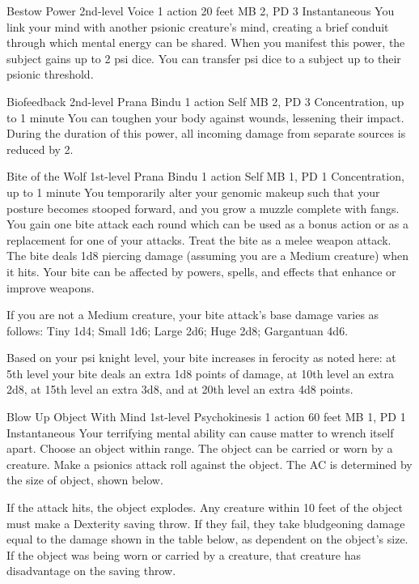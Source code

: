 \DndPowerHeader%
  {Bestow Power}
  {2nd-level Voice}
  {1 action}
  {20 feet}
  {MB 2, PD 3}
  {Instantaneous}
You link your mind with another psionic creature's mind,
creating a brief conduit through which mental energy can be shared.
When you manifest this power,
the subject gains up to 2 psi dice.
You can transfer psi dice to a subject up to their psionic threshold.

\DndPowerHeader%
  {Biofeedback}
  {2nd-level Prana Bindu}
  {1 action}
  {Self}
  {MB 2, PD 3}
  {Concentration, up to 1 minute}
    You can toughen your body against wounds,
    lessening their impact.
    During the duration of this power, all incoming damage
    from separate sources is reduced by 2.

\DndPowerHeader%
  {Bite of the Wolf}
  {1st-level Prana Bindu}
  {1 action}
  {Self}
  {MB 1, PD 1}
  {Concentration, up to 1 minute}
  You temporarily alter your genomic makeup
  such that your posture becomes stooped forward,
  and you grow a muzzle complete with fangs.
  You gain one bite attack each round which
  can be used as a bonus action or as a replacement
  for one of your attacks.
  Treat the bite as a melee weapon attack.
  The bite deals 1d8 piercing damage
  (assuming you are a Medium creature)
  when it hits.
  Your bite can be affected by
  powers, spells, and effects
  that enhance or improve weapons.
  
  If you are not a Medium creature,
  your bite attack's base damage varies as follows:
  Tiny 1d4; Small 1d6; Large 2d6; Huge 2d8;
  Gargantuan 4d6.
  
  Based on your psi knight level,
  your bite increases in ferocity as noted here:
  at 5th level your bite deals an extra 1d8 points of damage,
  at 10th level an extra 2d8,
  at 15th level an extra 3d8,
  and at 20th level an extra 4d8 points.

\DndPowerHeader%
  {Blow Up Object With Mind}
  {1st-level Psychokinesis}
  {1 action}
  {60 feet}
  {MB 1, PD 1}
  {Instantaneous}
Your terrifying mental ability can cause matter to
wrench itself apart. 
Choose an object within range.
The object can be carried or worn by a creature.
Make a psionics attack roll against the object.
The AC is determined by the size of object, shown below.

If the attack hits, the object explodes.
Any creature within 10 feet of the object must make
a Dexterity saving throw.
If they fail,
they take bludgeoning damage equal to
the damage shown in the table below,
as dependent on the object's size.
If the object was being worn or carried by a creature,
that creature has disadvantage on the saving throw.


